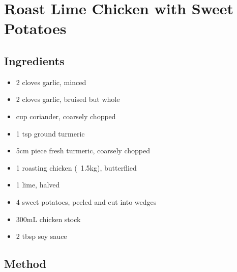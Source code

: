 \clearpage
\section{Roast Lime Chicken with Sweet Potatoes}


\subsection{Ingredients}

\begin{itemize}
    \item 2 cloves garlic, minced
    \item 2 cloves garlic, bruised but whole
    \item {} cup coriander, coarsely chopped
    \item 1 tsp ground turmeric
    \item 5cm piece fresh turmeric, coarsely chopped
    \item 1 roasting chicken (~1.5kg), butterflied
    \item 1 lime, halved
    \item 4 sweet potatoes, peeled and cut into wedges
    \item 300mL chicken stock
    \item 2 tbsp soy sauce
\end{itemize}

\subsection{Method}

